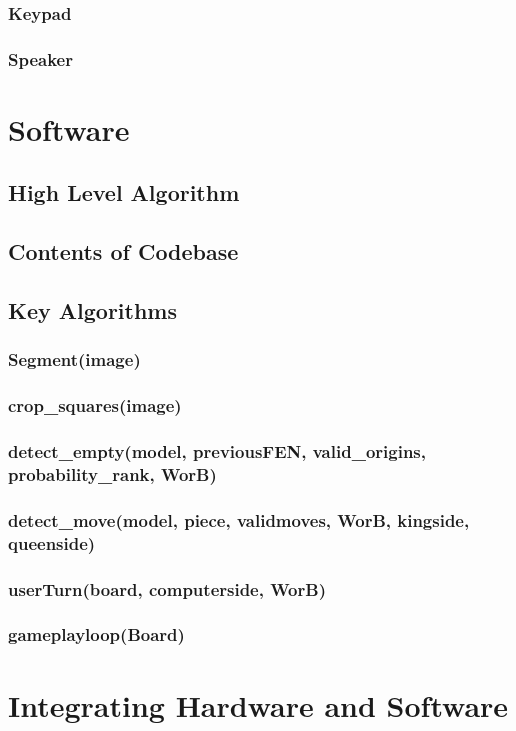 \documentclass[onecolumn]{IEEEtran}
\begin{document}
\subsubsection{Keypad}
\subsubsection{Speaker}
\section{Software}
\subsection{High Level Algorithm}
\subsection{Contents of Codebase}
\subsection{Key Algorithms}
\subsubsection{Segment(image)}
\subsubsection{crop\_squares(image)} 
\subsubsection{detect\_empty(model, previousFEN, valid\_origins, probability\_rank, WorB)}
\subsubsection{detect\_move(model, piece, validmoves, WorB, kingside, queenside)}
\subsubsection{userTurn(board, computerside, WorB)}
\subsubsection{gameplayloop(Board)}
\section{Integrating Hardware and Software}
\end{document}
